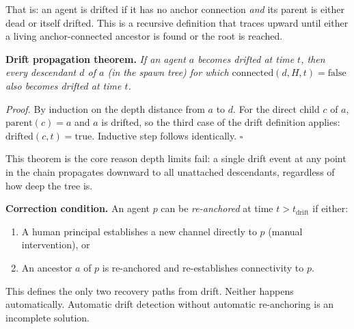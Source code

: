 That is: an agent is drifted if it has no anchor connection \emph{and} its
parent is either dead or itself drifted. This is a recursive definition that
traces upward until either a living anchor-connected ancestor is found or the
root is reached.

\medskip
\noindent\textbf{Drift propagation theorem.}
\textit{If an agent $a$ becomes drifted at time $t$, then every descendant
$d$ of $a$ (in the spawn tree) for which $\text{connected}(d, H, t) = \text{false}$
also becomes drifted at time $t$.}

\textit{Proof.} By induction on the depth distance from $a$ to $d$. For the
direct child $c$ of $a$, $\text{parent}(c) = a$ and $a$ is drifted, so the third
case of the drift definition applies: $\text{drifted}(c, t) = \text{true}$.
Inductive step follows identically. $\square$

This theorem is the core reason depth limits fail: a single drift event at any
point in the chain propagates downward to all unattached descendants,
regardless of how deep the tree is.

\medskip
\noindent\textbf{Correction condition.}
An agent $p$ can be \emph{re-anchored} at time $t > t_{\text{drift}}$ if either:
\begin{enumerate}
    \item A human principal establishes a new channel directly to $p$ (manual intervention), or
    \item An ancestor $a$ of $p$ is re-anchored and re-establishes connectivity to $p$.
\end{enumerate}

This defines the only two recovery paths from drift. Neither happens automatically.
Automatic drift detection without automatic re-anchoring is an incomplete solution.


